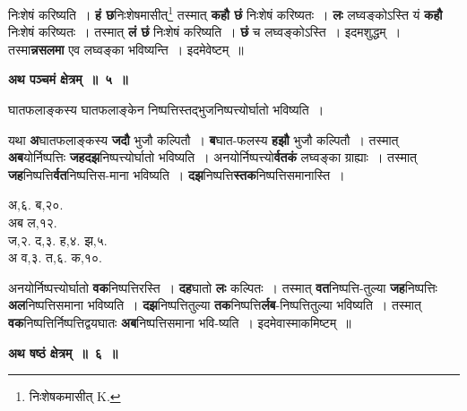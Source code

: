 \documentclass[11pt, openany]{book}
\begin{document}
\newpage
\noindent निःशेषं करिष्यति~। \textbf{हं छ}निःशेषमासीत्\renewcommand{\thefootnote}{१}\footnote{निःशेषकमासीत् {\en K.}} तस्मात् \textbf{कहौ छं} निःशेषं करिष्यतः~। \textbf{लः} लघ्वङ्कोऽस्ति यं \textbf{कहौ} निःशेषं करिष्यतः~। तस्मात् \textbf{लं छं} निःशेषं करिष्यति~। \textbf{छं} च लघ्वङ्कोऽस्ति~। इदमशुद्धम्~। तस्मा\textbf{न्नसलमा} एव लघ्वङ्का भविष्यन्ति~। इदमेवेष्टम्~॥ 
\vspace{2mm}

\begin{center}
\textbf{\large अथ पञ्चमं क्षेत्रम्~॥~५~॥}
\end{center}

{\ab घातफलाङ्कस्य घातफलाङ्केन निष्पत्तिस्तद्भुजनिष्पत्त्योर्घातो भविष्यति~। }\\

\begin{flushleft}
\begin{minipage}[t]{0.64\textwidth}
\hspace{4mm} यथा \textbf{अ}घातफलाङ्कस्य \textbf{जदौ} भुजौ कल्पितौ~। \textbf{ब}घात-फलस्य \textbf{हझौ} भुजौ कल्पितौ~। तस्मात् \textbf{अब}योर्निष्पत्तिः \textbf{जहदझ}निष्पत्त्योर्घातो भविष्यति~। अनयोर्निष्पत्त्यो\textbf{र्वतकं} लघ्वङ्का ग्राह्याः~। तस्मात् \textbf{जह}निष्पत्ति\textbf{र्वत}निष्पत्तिस-माना भविष्यति~। \textbf{दझ}निष्पत्ति\textbf{स्तक}निष्पत्तिसमानास्ति~।
\end{minipage} 
\hfill
\begin{minipage}[t]{0.28\textwidth}
अ,६. ब,२०.\\
{\color{white}अब} ल,१२.\\
ज,२. द,३. ह,४. झ,५.\\ 
{\color{white}अ} व,३. त,६. क,१०.
\end{minipage}
\end{flushleft}
\vspace{-3mm}

 \noindent अनयोर्निष्पत्त्योर्घातो \textbf{वक}निष्पत्तिरस्ति~। \textbf{दह}घातो \textbf{लः} कल्पितः~। तस्मात् \textbf{वत}निष्पत्ति-तुल्या \textbf{जह}निष्पत्तिः \textbf{अल}निष्पत्तिसमाना भविष्यति~। \textbf{दझ}निष्पत्तितुल्या \textbf{तक}निष्पत्ति\textbf{र्लब}-निष्पत्तितुल्या भविष्यति~। तस्मात् \textbf{वक}निष्पत्तिर्निष्पत्तिद्वयघातः \textbf{अब}निष्पत्तिसमाना भवि-ष्यति~। इदमेवास्माकमिष्टम्~॥ 
 \vspace{2mm}

\begin{center}
\textbf{\large अथ षष्ठं क्षेत्रम्~॥~६~॥}
\end{center}
 
\end{document}
